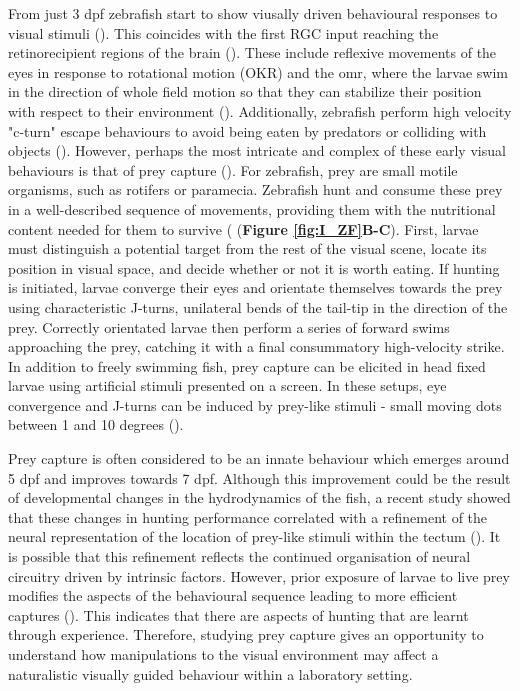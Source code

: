 From just 3 dpf zebrafish start to show viusally driven behavioural responses to visual stimuli (\cite{Easter1996TheRerio}). This coincides with the first RGC input reaching the retinorecipient regions of the brain (\cite{Burrill1994DevelopmentRerio, Easter1997TheRerio}). These include reflexive movements of the eyes in response to rotational motion (OKR) and the \gls{omr}, where the larvae swim in the direction of whole field motion so that they can stabilize their position with respect to their environment (\cite{Naumann2016FromResponse, Portugues2015Whole-fieldProcess, Kubo2014}). Additionally, zebrafish perform high velocity "c-turn" escape behaviours to avoid being eaten by predators or colliding with objects (\cite{Dunn2016}).   However, perhaps the most intricate and complex of these early visual behaviours is that of prey capture (\cite{Budick2000LocomotorCapture}). For zebrafish, prey are small motile organisms, such as rotifers or paramecia. Zebrafish hunt and consume these prey in a well-described sequence of movements, providing them with the nutritional content needed for them to survive (\cite{Budick2000LocomotorCapture, Gahtan2005, Patterson2013, McElligott2005PreyControl} (\textbf{Figure \ref{fig:I_ZF}B-C}). First, larvae must distinguish a potential target from the rest of the visual scene, locate its position in visual space, and decide whether or not it is worth eating. If hunting is initiated, larvae converge their eyes and orientate themselves towards the prey using characteristic J-turns, unilateral bends of the tail-tip in the direction of the prey. Correctly orientated larvae then perform a series of forward swims approaching the prey, catching it with a final consummatory high-velocity strike. In addition to freely swimming fish, prey capture can be elicited in head fixed larvae using artificial stimuli presented on a screen. In these setups, eye convergence and J-turns can be induced by prey-like stimuli - small moving dots between 1 and 10 degrees  (\cite{Bianco2015, Semmelhack2014, Bianco2011, Jouary2016ALarvae}). 

Prey capture is often considered to be an innate behaviour which emerges around 5 dpf and improves towards 7 dpf. Although this improvement could be the result of developmental changes in the hydrodynamics of the fish, a recent study showed that these changes in hunting performance correlated with a refinement of the neural representation of the location of prey-like stimuli within the tectum  (\cite{Avitan2019}). It is possible that this refinement reflects the continued organisation of neural circuitry driven by intrinsic factors. However, prior exposure of larvae to live prey modifies the aspects of the behavioural sequence leading to more efficient captures (\cite{Lagogiannis2019LearningLarvae}). This indicates that there are aspects of hunting that are learnt through experience. Therefore, studying prey capture gives an opportunity to understand how manipulations to the visual environment may affect a naturalistic visually guided behaviour within a laboratory setting.

